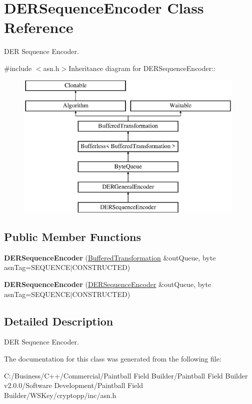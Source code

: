 \hypertarget{class_d_e_r_sequence_encoder}{
\section{DERSequenceEncoder Class Reference}
\label{class_d_e_r_sequence_encoder}
}


DER Sequence Encoder.  


{\ttfamily \#include $<$asn.h$>$}Inheritance diagram for DERSequenceEncoder::\begin{figure}[H]
\begin{center}
\leavevmode
\includegraphics[height=7cm]{class_d_e_r_sequence_encoder}
\end{center}
\end{figure}
\subsection*{Public Member Functions}
\begin{DoxyCompactItemize}
\item 
\hypertarget{class_d_e_r_sequence_encoder_af2e684c38e7941e683e3880ea97c8f33}{
{\bfseries DERSequenceEncoder} (\hyperlink{class_buffered_transformation}{BufferedTransformation} \&outQueue, byte asnTag=SEQUENCE$|$CONSTRUCTED)}
\label{class_d_e_r_sequence_encoder_af2e684c38e7941e683e3880ea97c8f33}

\item 
\hypertarget{class_d_e_r_sequence_encoder_afca95280210727594b5e8ba197504af5}{
{\bfseries DERSequenceEncoder} (\hyperlink{class_d_e_r_sequence_encoder}{DERSequenceEncoder} \&outQueue, byte asnTag=SEQUENCE$|$CONSTRUCTED)}
\label{class_d_e_r_sequence_encoder_afca95280210727594b5e8ba197504af5}

\end{DoxyCompactItemize}


\subsection{Detailed Description}
DER Sequence Encoder. 

The documentation for this class was generated from the following file:\begin{DoxyCompactItemize}
\item 
C:/Business/C++/Commercial/Paintball Field Builder/Paintball Field Builder v2.0.0/Software Development/Paintball Field Builder/WSKey/cryptopp/inc/asn.h\end{DoxyCompactItemize}
